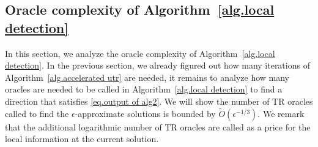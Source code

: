 \documentclass{mcom-l}
\numberwithin{equation}{section}
\begin{document}
\subsection{Oracle complexity of Algorithm~\ref{alg.local detection}}\label{sec.bisection}
In this section, we analyze the oracle complexity of Algorithm~\ref{alg.local detection}. In the previous section, we already figured out how many iterations of Algorithm~\ref{alg.accelerated utr} are needed, it remains to analyze how many oracles are needed to be called in Algorithm~\ref{alg.local detection} to find a direction that satisfies \eqref{eq.output of alg2}. We will show the number of TR oracles called to find the $\epsilon$-approximate solutions is bounded by $\tilde{O}(\epsilon^{-1/3})$. We remark that the additional logarithmic number of TR oracles are called as a price for the local information at the current solution.
\end{document}
